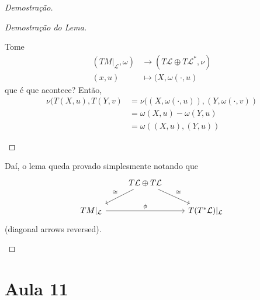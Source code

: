\begin{proof}[Demostra\c c\~ao]
\begin{lemma}
\begin{enumerate}
\begin{proof}[Demostra\c c\~ao do Lema]
\begin{enumerate}[label=\textbf{Step \arabic*}]
Tome 
\begin{align*}
	(TM|_{\mathcal{L}},\omega)  &\longrightarrow (T\mathcal{L}\oplus T\mathcal{L}^*,\nu) \\
	(x,u) &\longmapsto (X,\omega(\cdot ,u)
\end{align*}
que \'e que acontece? Ent\~ao,
\begin{align*}
	\nu(T(X,u),T(Y,v)&=\nu((X,\omega(\cdot ,u)),(Y,\omega(\cdot ,v))\\
	&=\omega(X,u)-\omega(Y,u)\\
	&=\omega((X,u),(Y,u))
\end{align*}
				\end{enumerate}
			\end{proof}
	\end{enumerate}
	Da\'i, o lema queda provado simplesmente notando que
	\[\begin{tikzcd}
	&T\mathcal{L}\oplus T\mathcal{L}\arrow[dl,"\cong ",swap]\arrow[dr,"\cong "]\\
	TM|_{\mathcal{L}}\arrow[rr,"\phi"]&&T(T^*\mathcal{L})|_{\mathcal{L}}
	\end{tikzcd}\]
	(diagonal arrows reversed).
\end{lemma}
\end{proof}



\section{Aula 11}



